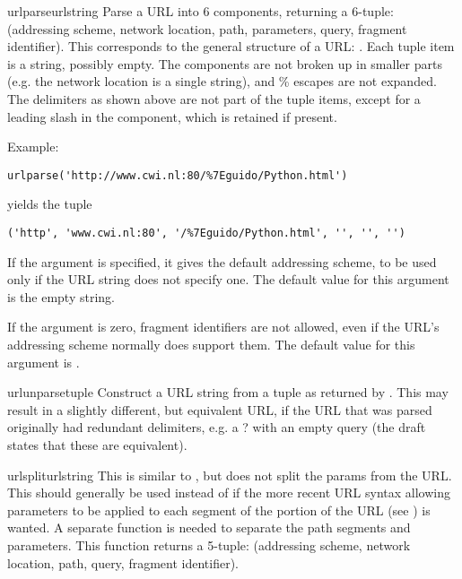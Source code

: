 \begin{funcdesc}{urlparse}{urlstring}
Parse a URL into 6 components, returning a 6-tuple: (addressing
scheme, network location, path, parameters, query, fragment
identifier).  This corresponds to the general structure of a URL:
.
Each tuple item is a string, possibly empty.
The components are not broken up in smaller parts (e.g. the network
location is a single string), and \% escapes are not expanded.
The delimiters as shown above are not part of the tuple items,
except for a leading slash in the  component, which is
retained if present.

Example:

\begin{verbatim}
urlparse('http://www.cwi.nl:80/%7Eguido/Python.html')
\end{verbatim}

yields the tuple

\begin{verbatim}
('http', 'www.cwi.nl:80', '/%7Eguido/Python.html', '', '', '')
\end{verbatim}

If the  argument is specified, it gives the
default addressing scheme, to be used only if the URL string does not
specify one.  The default value for this argument is the empty string.

If the  argument is zero, fragment identifiers
are not allowed, even if the URL's addressing scheme normally does
support them.  The default value for this argument is .
\end{funcdesc}

\begin{funcdesc}{urlunparse}{tuple}
Construct a URL string from a tuple as returned by .
This may result in a slightly different, but equivalent URL, if the
URL that was parsed originally had redundant delimiters, e.g. a ? with
an empty query (the draft states that these are equivalent).
\end{funcdesc}

\begin{funcdesc}{urlsplit}{urlstring}
This is similar to , but does not split the
params from the URL.  This should generally be used instead of
 if the more recent URL syntax allowing
parameters to be applied to each segment of the  portion of
the URL (see ) is wanted.  A separate function is needed to
separate the path segments and parameters.  This function returns a
5-tuple: (addressing scheme, network location, path, query, fragment
identifier).
\end{funcdesc}

